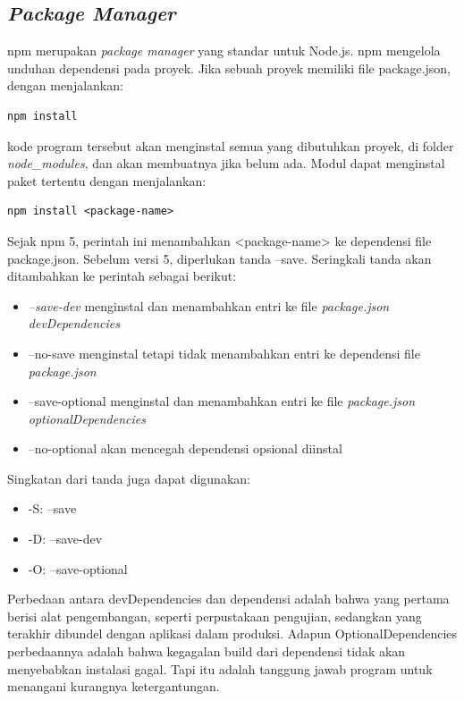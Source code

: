 \subsection{\textit{Package Manager}}
\label{sec: Package Manager}
npm merupakan \textit{package manager} yang standar untuk Node.js. npm mengelola unduhan dependensi pada proyek. Jika sebuah proyek memiliki file package.json, dengan menjalankan:  
     \begin{lstlisting}[basicstyle=\ttfamily, frame=single,
        columns=fullflexible, breaklines=true, numbers=none]
npm install
    \end{lstlisting} 
    kode program tersebut akan menginstal semua yang dibutuhkan proyek, di folder \textit{node\_modules}, dan akan membuatnya jika belum ada. Modul dapat menginstal paket tertentu dengan menjalankan: 
         \begin{lstlisting}[basicstyle=\ttfamily, frame=single,
        columns=fullflexible, breaklines=true, numbers=none]
npm install <package-name>
    \end{lstlisting}
Sejak npm 5, perintah ini menambahkan <package-name> ke dependensi file package.json. Sebelum versi 5, diperlukan tanda --save. Seringkali tanda akan ditambahkan ke perintah sebagai berikut:
    \begin{itemize}
        \item \textit{--save-dev} menginstal dan menambahkan entri ke file \textit{package.json devDependencies}
        \item --no-save menginstal tetapi tidak menambahkan entri ke dependensi file \textit{package.json}
        \item --save-optional menginstal dan menambahkan entri ke file \textit{package.json optionalDependencies}
        \item --no-optional akan mencegah dependensi opsional diinstal
    \end{itemize}
    Singkatan dari tanda juga dapat digunakan:
        \begin{itemize}
        \item -S: --save
        \item -D: --save-dev
        \item -O: --save-optional
    \end{itemize}
Perbedaan antara devDependencies dan dependensi adalah bahwa yang pertama berisi alat pengembangan, seperti perpustakaan pengujian, sedangkan yang terakhir dibundel dengan aplikasi dalam produksi. Adapun OptionalDependencies perbedaannya adalah bahwa kegagalan build dari dependensi tidak akan menyebabkan instalasi gagal. Tapi itu adalah tanggung jawab program untuk menangani kurangnya ketergantungan. 

